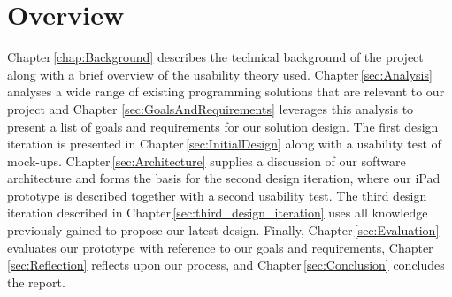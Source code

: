 \section{Overview}
Chapter\,\ref{chap:Background} describes the technical background of the project along with a brief overview of the usability theory used. Chapter\,\ref{sec:Analysis} analyses a
wide range of existing programming solutions that are relevant to our project and Chapter
\ref{sec:GoalsAndRequirements} leverages this analysis to present a list of
goals and requirements for our solution design. The first design
iteration is presented in Chapter\,\ref{sec:InitialDesign} along with a usability test of mock-ups. Chapter\,\ref{sec:Architecture}
supplies a discussion of our software architecture and forms the basis for the second design iteration, where our iPad prototype is
described together with a second usability test. The third design iteration described in Chapter\,\ref{sec:third_design_iteration} uses all knowledge previously gained to propose our latest design. Finally, Chapter\,\ref{sec:Evaluation}
evaluates our prototype with reference to our goals and requirements, Chapter\,\ref{sec:Reflection} reflects
upon our process, and Chapter\,\ref{sec:Conclusion} concludes the report.
